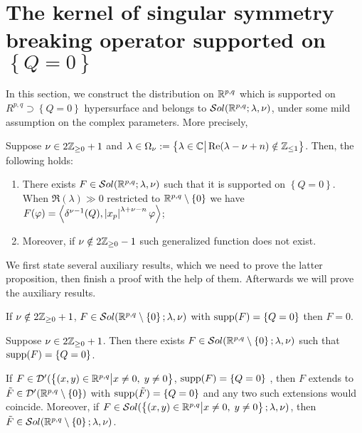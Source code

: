\documentclass[10pt]{article} %
\newcommand{\D}{\mathcal{D}}
\theoremstyle{definition}
\theoremstyle{remark}
\begin{document}
\section{The kernel of singular symmetry breaking operator supported on $\left\{ Q=0 \right\}$}
In this section, we construct the distribution on $\R^{p,q}$ which is supported on
$R^{p,q}\supset\left\{ Q=0 \right\}$ hypersurface and belongs to $\sol$,
under some mild assumption on the complex parameters. More precisely,
\begin{myprop}
	Suppose $\nu\in2\Z_{\geq0}+1$ and $\lambda\in\Omega_\nu:=
	\mysetn{\lambda\in\C}{\Re(\lambda-\nu+n)\notin\Z_{\leq1}}$. Then, the following holds:
	\begin{enumerate}
		\item 
	There exists $F\in\sol$ such that it is supported on $\left\{ Q=0 \right\}$.
	When $\Re(\lambda)\gg0$ restricted to $\R^{p,q}\setminus\left\{ 0 \right\}$ we have $F(\varphi)=\myabra{
		\delta^{\nu-1}(Q),\myabs{x_p}^{\lambda+\nu-n}\varphi}$;
	\item Moreover, if $\nu\notin2\Z_{\geq0}-1$ such generalized function does not exist.
	\end{enumerate}
	\label{thm:sing_q}
\end{myprop}
We first state several auxiliary results, which we need to prove the latter proposition, then finish a proof with the help of them.
Afterwards we will prove the auxiliary results.
\begin{mylem}
	If $\nu\notin2\Z_{\geq0}+1$, $F\in\sol[\R^{p,q}\setminus\left\{ 0 \right\}]$ with $\supp(F)=\left\{ Q=0 \right\}$
	then $F=0$.
	\label{lem:sing_q_1}
\end{mylem}
\begin{mylem}
	Suppose $\nu\in2\Z_{\geq0}+1$. Then there exists $F\in\sol[\R^{p,q}\setminus\left\{ 0 \right\}]$
	such that $\supp(F)=\left\{ Q=0 \right\}$.
	\label{lem:sing_q_2}
\end{mylem}
\begin{mylem}
	If $F\in\D'(\mysetn{(x,y)\in\R^{p,q}}{x\neq0,\;y\neq0}$, $\supp(F)=\left\{ Q=0 \right\}$
	, then $F$ extends to $\tilde{F}\in\D'(\R^{p,q}\setminus\left\{ 0 \right\})$ with $\supp(\tilde{F})=\left\{ Q=0 \right\}$
	and any two such extensions would coincide.
	Moreover, if $F\in\sol[\Upp]$, then $\tilde{F}\in\sol[\R^{p,q}\setminus\left\{ 0 \right\}]$.
	\label{lem:sing_q_3}
\end{mylem}
\end{document}

